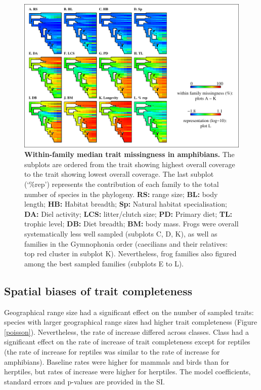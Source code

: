 \clearpage
\begin{figure}[]
\centering
\includegraphics[scale=1.1]{figures/chapter2/NA_phylo_patterns/Amphibians_coverage}
\caption[Within-family median trait missingness in amphibians]{\textbf{Within-family median trait missingness in amphibians.} The subplots are ordered from the trait showing highest overall coverage to the trait showing lowest overall coverage. The last subplot (`\%rep') represents the contribution of each family to the total number of species in the phylogeny. \textbf{RS:} range size; \textbf{BL:} body length; \textbf{HB:} Habitat breadth; \textbf{Sp:} Natural habitat specialisation; \textbf{DA:} Diel activity; \textbf{LCS:} litter/clutch size; \textbf{PD:} Primary diet; \textbf{TL:} trophic level; \textbf{DB:} Diet breadth; \textbf{BM:} body mass. Frogs were overall systematically less well sampled (subplots C, D, K), as well as families in the Gymnophonia order (caecilians and their relatives: top red cluster in subplot K). Nevertheless, frog families also figured among the best sampled families (subplots E to L).}
\label{familycov_amphibians}
\end{figure}

\clearpage
\subsection{Spatial biases of trait completeness} 
Geographical range size had a significant effect on the number of sampled traits: species with larger geographical range sizes had higher trait completeness (Figure \ref{poisson}). Nevertheless, the rate of increase differed across classes. Class had a significant effect on the rate of increase of trait completeness except for reptiles (the rate of increase for reptiles was similar to the rate of increase for amphibians). Baseline rates were higher for mammals and birds than for herptiles, but rates of increase were higher for herptiles. The model coefficients, standard errors and p-values are provided in the SI.

